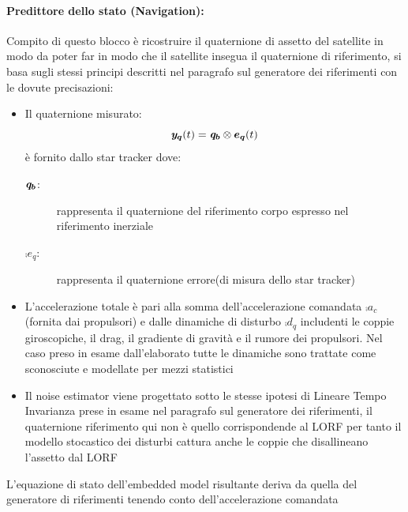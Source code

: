 \paragraph{Predittore dello stato (Navigation):} Compito di questo blocco è
ricostruire il quaternione di assetto del satellite in modo da poter far in modo
che il satellite insegua il quaternione di riferimento, si basa sugli stessi
principi descritti nel paragrafo sul generatore dei riferimenti con le dovute
precisazioni:
\begin{itemize}
  \item Il quaternione misurato:
  \begin{equation}
  	\boldsymbol{\mathit{y}_q}(t)=\boldsymbol{\mathit{q}_b} \otimes \boldsymbol{e_q}(t)
  \end{equation} è fornito dallo star tracker dove:
  \begin{description}
  \item[$\boldsymbol{\mathit{q}_b}$:]rappresenta il quaternione del riferimento
  corpo espresso nel riferimento inerziale
  \item[$\comp{e_q}$:]rappresenta il quaternione errore(di misura dello star
  tracker)
  \end{description}
  \item L'accelerazione totale è pari alla somma dell'accelerazione comandata
  $\comp{a_c}$ (fornita dai propulsori) e dalle dinamiche di disturbo
  $\comp{d_q}$ includenti le coppie giroscopiche, il drag, il gradiente di
  gravità e il rumore dei propulsori. Nel caso preso in esame dall'elaborato
  tutte le dinamiche sono trattate come sconosciute e modellate per mezzi
  statistici
  \item Il noise estimator viene progettato sotto le stesse ipotesi di Lineare
  Tempo Invarianza prese in esame nel paragrafo sul generatore dei riferimenti,
  il quaternione riferimento qui non è quello corrispondende al LORF per tanto
  il modello stocastico dei disturbi cattura anche le coppie che disallineano
  l'assetto dal LORF
\end{itemize}

L'equazione di stato dell'embedded model risultante deriva da quella del
generatore di riferimenti tenendo conto dell'accelerazione comandata 

